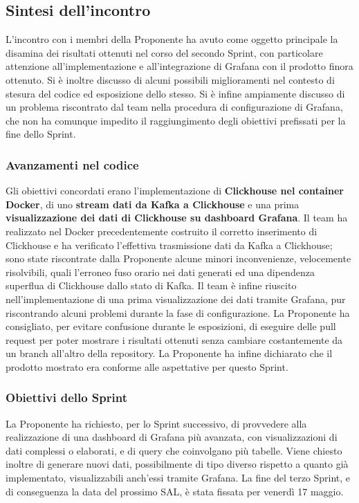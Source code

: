 \documentclass[8pt]{article}
\begin{document}
\subsection{Sintesi dell'incontro}
L'incontro con i membri della Proponente ha avuto come oggetto principale la disamina dei risultati ottenuti nel corso del secondo Sprint, con particolare attenzione all'implementazione e all'integrazione di Grafana con il prodotto finora ottenuto. Si è inoltre discusso di alcuni possibili miglioramenti nel contesto di stesura del codice ed esposizione dello stesso. Si è infine ampiamente discusso di un problema riscontrato dal team nella procedura di configurazione di Grafana, che non ha comunque impedito il raggiungimento degli obiettivi prefissati per la fine dello Sprint.

\subsubsection{Avanzamenti nel codice}
Gli obiettivi concordati erano l'implementazione di \textbf{Clickhouse nel container Docker}, di uno \textbf{stream dati da Kafka a Clickhouse} e una prima \textbf{visualizzazione dei dati di Clickhouse su dashboard Grafana}. Il team ha realizzato nel Docker precedentemente costruito il corretto inserimento di Clickhouse e ha verificato l'effettiva trasmissione dati da Kafka a Clickhouse; sono state riscontrate dalla Proponente alcune minori inconvenienze, velocemente risolvibili, quali l'erroneo fuso orario nei dati generati ed una dipendenza superflua di Clickhouse dallo stato di Kafka. Il team è infine riuscito nell'implementazione di una prima visualizzazione dei dati tramite Grafana, pur riscontrando alcuni problemi durante la fase di configurazione. La Proponente ha consigliato, per evitare confusione durante le esposizioni, di eseguire delle pull request per poter mostrare i risultati ottenuti senza cambiare costantemente da un branch all'altro della repository. La Proponente ha infine dichiarato che il prodotto mostrato era conforme alle aspettative per questo Sprint.

\subsubsection{Obiettivi dello Sprint}
La Proponente ha richiesto, per lo Sprint successivo, di provvedere alla realizzazione di una dashboard di Grafana più avanzata, con visualizzazioni di dati complessi o elaborati, e di query che coinvolgano più tabelle. Viene chiesto inoltre di generare nuovi dati, possibilmente di tipo diverso rispetto a quanto già implementato, visualizzabili anch'essi tramite Grafana. La fine del terzo Sprint, e di conseguenza la data del prossimo SAL, è stata fissata per venerdì 17 maggio. 
\end{document}

